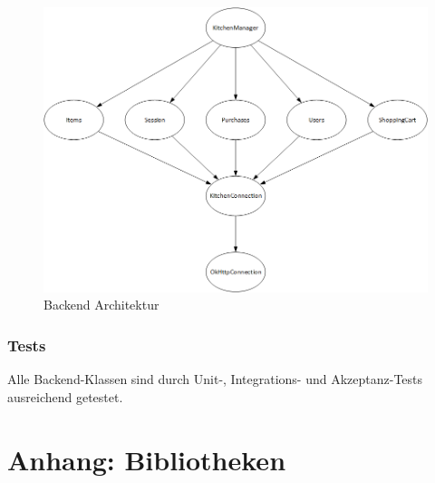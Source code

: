 \documentclass{scrartcl}
\begin{document}
	\begin{figure}[!h]
		\centering
		\includegraphics[scale=0.5]{./figures/classStructure.png}
		\caption{Backend Architektur}
		\label{backendArchitecture}
	\end{figure}

	\subsubsection{Tests}

	Alle Backend-Klassen sind durch Unit-, Integrations- und Akzeptanz-Tests ausreichend getestet.

	\section{Anhang: Bibliotheken}\label{sec:bib}

\end{document}
